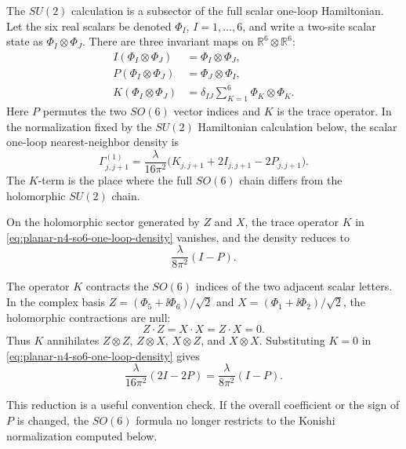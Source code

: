 The \(SU(2)\) calculation is a subsector of the full scalar one-loop
Hamiltonian.  Let the six real scalars be denoted \(\Phi_I\),
\(I=1,\ldots,6\), and write a two-site scalar state as
\(\Phi_I\otimes\Phi_J\).  There are three invariant maps on
\(\mathbb R^6\otimes\mathbb R^6\):
\[
\begin{aligned}
  I(\Phi_I\otimes\Phi_J)&=\Phi_I\otimes\Phi_J,\\
  P(\Phi_I\otimes\Phi_J)&=\Phi_J\otimes\Phi_I,\\
  K(\Phi_I\otimes\Phi_J)&=\delta_{IJ}\sum_{K=1}^6\Phi_K\otimes\Phi_K .
\end{aligned}
\]
Here \(P\) permutes the two \(SO(6)\) vector indices and \(K\) is the trace
operator.  In the normalization fixed by the \(SU(2)\) Hamiltonian calculation
below, the scalar one-loop nearest-neighbor
density is
\begin{equation}
  \Gamma^{(1)}_{j,j+1}
  =
  \frac{\lambda}{16\pi^2}\bigl(K_{j,j+1}+2I_{j,j+1}-2P_{j,j+1}\bigr).
  \label{eq:planar-n4-so6-one-loop-density}
\end{equation}
The \(K\)-term is the place where the full \(SO(6)\) chain differs from the
holomorphic \(SU(2)\) chain.

\begin{remark}
\label{rem:planar-n4-so6-to-su2}
On the holomorphic sector generated by \(Z\) and \(X\), the trace operator
\(K\) in \eqref{eq:planar-n4-so6-one-loop-density} vanishes, and the density
reduces to
\[
  \frac{\lambda}{8\pi^2}(I-P).
\]

The operator \(K\) contracts the \(SO(6)\) indices of the two adjacent scalar
letters.  In the complex basis \(Z=(\Phi_5+\ii\Phi_6)/\sqrt2\) and
\(X=(\Phi_1+\ii\Phi_2)/\sqrt2\), the holomorphic contractions are null:
\[
  Z\cdot Z=X\cdot X=Z\cdot X=0 .
\]
Thus \(K\) annihilates \(Z\otimes Z\), \(Z\otimes X\), \(X\otimes Z\), and
\(X\otimes X\).  Substituting \(K=0\) in
\eqref{eq:planar-n4-so6-one-loop-density} gives
\[
  \frac{\lambda}{16\pi^2}(2I-2P)
  =
  \frac{\lambda}{8\pi^2}(I-P).
\]
\end{remark}

This reduction is a useful convention check.  If the overall coefficient or
the sign of \(P\) is changed, the \(SO(6)\) formula no longer restricts to the
Konishi normalization computed below.

